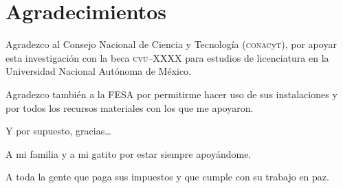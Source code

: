 \chapter*{Agradecimientos}

{\small
Agradezco al Consejo Nacional de Ciencia y Tecnología (\textsc{conac}y\textsc{t}), por apoyar esta investigación con la beca \textsc{cvu}--XXXX para estudios de licenciatura en la Universidad Nacional Autónoma de México.

Agradezco también a la FESA por permitirme hacer uso de sus instalaciones y por todos los recursos materiales con los que me apoyaron.

Y por supuesto, gracias\ldots

A mi familia y a mi gatito por estar siempre apoyándome.

A toda la gente que paga sus impuestos y que cumple con su trabajo en paz.
}
